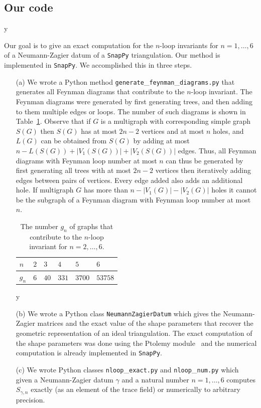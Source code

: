 \documentclass[12pt]{amsart}
\theoremstyle{definition}
\def\printname#1{
        \if\draft y
                \smash{\makebox[0pt]{\hspace{-0.5in}
                        \raisebox{8pt}{\tt\tiny #1}}}
        \fi
}
\def\lbl#1{\label{#1}\printname{#1}}
\def\ga{\gamma}
\begin{document}
\subsection{Our code}
\lbl{sub.code}

Our goal is to give an exact computation for the $n$-loop invariants
for $n=1,\dots,6$ of a Neumann-Zagier datum of a \texttt{SnapPy}
triangulation. Our method is implemented in \texttt{SnapPy}.
We accomplished this in three steps.

\begin{itemize}
\item[(a)] 
We wrote a Python method 
\texttt{generate}\_\texttt{feynman}\_\texttt{diagrams.py}
that generates all Feynman diagrams that contribute to the $n$-loop 
invariant. The Feynman diagrams were generated by first generating trees,
and then adding to them multiple edges or loops. The number of such diagrams 
is shown in Table~\ref{t.diagrams}. 
Observe that if $G$ is a multigraph with corresponding simple graph $S(G)$ 
then $S(G)$ has at most $2n-2$ vertices and at most $n$ holes, and
$L(G)$ can be obtained from $S(G)$ by adding at most 
$n-L(S(G))+|V_1(S(G))|+|V_2(S(G))|$ edges. Thus, 
all Feynman diagrams with Feynman loop number at most $n$ can thus be 
generated by first generating all trees with at most $2n-2$ vertices then 
iteratively adding edges between pairs of vertices. Every edge added also 
adds an additional hole. If multigraph $G$ has more than $n-|V_1(G)|-|V_2(G)|$ 
holes it cannot be the subgraph of a Feynman diagram with Feynman loop 
number at most $n$. 
\begin{table}
\begin{center}
\begin{tabular}{|l||l|l|l|l|l|}\hline
 $n$ & $2$ & $3$ & $4$ & $5$ & $6$ \\ \hline
$g_n$ & $6$ & $40$ & $331$ & $3700$ & $53758$ \\ \hline
\end{tabular}\vspace{.2cm}
\caption{The number $g_n$ of graphs that contribute to the $n$-loop 
invariant for $n=2,\dots,6$.} 
\lbl{t.diagrams}
\end{center}
\end{table}
\item[(b)]
We wrote a Python class \texttt{NeumannZagierDatum} which gives the 
Neumann-Zagier matrices and the exact value of the shape parameters
that recover the geometric representation of an ideal triangulation.
The exact computation of the shape parameters was done using the Ptolemy
module~\cite{Ga:ptolemy,snappy} and the numerical computation is already
implemented in \texttt{SnapPy}.
\item[(c)]
We wrote Python classes \texttt{nloop}\_\texttt{exact.py} 
and \texttt{nloop}\_\texttt{num.py} which given a Neumann-Zagier datum $\ga$
and a natural number $n=1,\dots,6$ computes $S_{\gamma,n}$ exactly (as 
an element of the trace field) or numerically to arbitrary precision.
\end{itemize}
\end{document}
